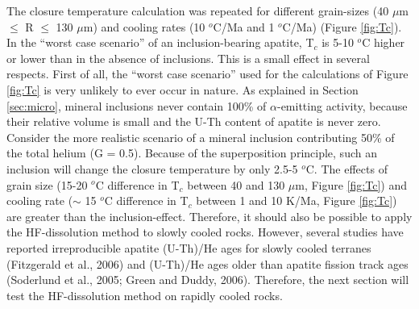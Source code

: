 \documentclass{article}
\begin{document}
The  closure  temperature   calculation  was  repeated  for  different
grain-sizes (40 $\mu$m  $\leq$ R $\leq$ 130 $\mu$m)  and cooling rates
(10 $^o$C/Ma  and 1 $^o$C/Ma)  (Figure \ref{fig:Tc}).  In  the ``worst
case scenario''  of an inclusion-bearing apatite, T$_c$  is 5-10 $^o$C
higher or  lower than in the  absence of inclusions.  This  is a small
effect in several respects.  First of all, the ``worst case scenario''
used for the  calculations of Figure \ref{fig:Tc} is  very unlikely to
ever  occur  in  nature.   As explained  in  Section  \ref{sec:micro},
mineral inclusions never  contain 100\% of $\alpha$-emitting activity,
because their relative volume is small and the U-Th content of apatite
is  never zero.   Consider the  more realistic  scenario of  a mineral
inclusion contributing 50\% of the total helium (G = 0.5).  Because of
the superposition principle, such an inclusion will change the closure
temperature by  only 2.5-5  $^o$C.  The effects  of grain  size (15-20
$^o$C  difference   in  T$_c$  between  40  and   130  $\mu$m,  Figure
\ref{fig:Tc}) and  cooling rate ($\sim$  15 $^o$C difference  in T$_c$
between  1 and  10 K/Ma,  Figure  \ref{fig:Tc}) are  greater than  the
inclusion-effect.  Therefore, it should  also be possible to apply the
HF-dissolution  method  to  slowly  cooled  rocks.   However,  several
studies have reported irreproducible apatite (U-Th)/He ages for slowly
cooled  terranes (Fitzgerald et  al., 2006)  and (U-Th)/He  ages older
than apatite  fission track  ages (Soderlund et  al., 2005;  Green and
Duddy,   2006).    Therefore,  the   next   section   will  test   the
HF-dissolution method on rapidly cooled rocks.
\end{document}
